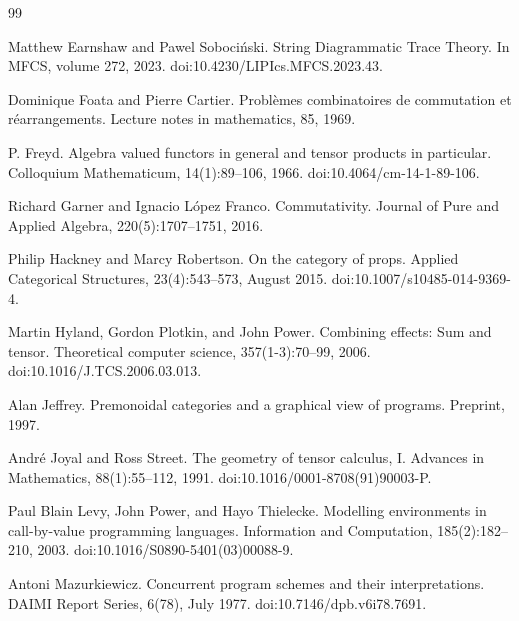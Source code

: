 \documentclass[10pt,a4paper]{article}
\begin{document}
\begin{thebibliography}{99}
\par\noindent    Matthew Earnshaw and Pawel Sobociński.  String Diagrammatic Trace Theory.  In MFCS, volume 272, 2023.  doi:10.4230/LIPIcs.MFCS.2023.43.  

\par\noindent    Dominique Foata and Pierre Cartier.  Problèmes combinatoires de commutation et réarrangements.  Lecture notes in mathematics, 85, 1969.  

\par\noindent    P. Freyd.  Algebra valued functors in general and tensor products in particular.  Colloquium Mathematicum, 14(1):89--106, 1966.  doi:10.4064/cm-14-1-89-106.  

\par\noindent    Richard Garner and Ignacio López Franco.  Commutativity.  Journal of Pure and Applied Algebra, 220(5):1707--1751, 2016.  

\par\noindent    Philip Hackney and Marcy Robertson.  On the category of props.  Applied Categorical Structures, 23(4):543--573, August 2015.  doi:10.1007/s10485-014-9369-4.  

\par\noindent    Martin Hyland, Gordon Plotkin, and John Power.  Combining effects: Sum and tensor.  Theoretical computer science, 357(1-3):70--99, 2006.  doi:10.1016/J.TCS.2006.03.013.  

\par\noindent    Alan Jeffrey.  Premonoidal categories and a graphical view of programs.  Preprint, 1997.  

\par\noindent    André Joyal and Ross Street.  The geometry of tensor calculus, I.  Advances in Mathematics, 88(1):55--112, 1991.  doi:10.1016/0001-8708(91)90003-P.  

\par\noindent    Paul Blain Levy, John Power, and Hayo Thielecke.  Modelling environments in call-by-value programming languages.  Information and Computation, 185(2):182--210, 2003.  doi:10.1016/S0890-5401(03)00088-9.  

\par\noindent    Antoni Mazurkiewicz.  Concurrent program schemes and their interpretations.  DAIMI Report Series, 6(78), July 1977.  doi:10.7146/dpb.v6i78.7691.  


\end{thebibliography}
\end{document}

